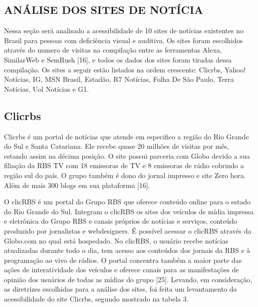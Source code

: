 \documentclass[a4paper]{article}
\begin{document}
\begin{titlepage}
\section{ANÁLISE DOS SITES DE NOTÍCIA}

Nessa seção será analisado a acessibilidade de 10 sites de notícias existentes no Brasil para pessoas com deficiência visual e auditiva. Os sites foram escolhidos através do numero de visitas na compilação entre as ferramentas Alexa, SimilarWeb e SemRush [16], e todos os dados dos sites foram tiradas dessa compilação. Os sites a seguir estão listados na ordem crescente: Clicrbs, Yahoo! Notícias, IG, MSN Brasil, Estadão, R7 Notícias, Folha De São Paulo, Terra Notícias, Uol Notícias e G1.

\subsection{Clicrbs}

Clicrbs é um portal de notícias que atende em especifico a região do Rio Grande do Sul e Santa Catariana. Ele recebe quase 20 milhões de visitas por mês, estando assim na décima posição. O site possui parceria com Globo devido a sua filiação da RBS TV com 18 emissoras de TV e 8 emissoras de rádio cobrindo a região sul do país. O grupo também é dono do jornal impresso e site Zero hora. Além de mais 300 blogs em sua plataforma [16].

O clicRBS é um portal do Grupo RBS que oferece conteúdo online para o estado do Rio Grande do Sul. Integram o clicRBS os sites dos veículos de mídia impressa e eletrônica do Grupo RBS e canais próprios de notícias e serviços, conteúdo produzido por jornalistas e webdesigners. É possível acessar o clicRBS através da Globo.com no qual está hospedado. No clicRBS, o usuário recebe notícias atualizadas durante todo o dia, tem acesso aos conteúdos dos jornais da RBS e à programação ao vivo de rádios. O portal concentra também a maior parte das ações de interatividade dos veículos e oferece canais para as manifestações de opinião dos usuários de todas as mídias do grupo [25]. Levando, em consideração, as diretrizes escolhidas para a análise dos sites, foi feita um levantamento da acessibilidade do site Clicrbs, segundo mostrado na tabela 3.\\


\end{titlepage}
\end{document}
